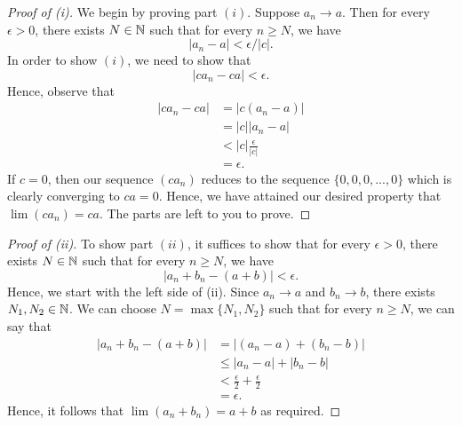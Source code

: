 \begin{proof}[Proof of (i)]
We begin by proving part \( (i)\). Suppose \( a_n \to a \). Then for every \( \epsilon  > 0 \), there exists 
\( N \in \mathbb{N} \) such that for every \( n \geq N \), we have 
\[ | a_n  - a  | < \epsilon / | c |. \tag{1}\]
In order to show \( (i)\), we need to show that 
\[ | ca_n - ca | < \epsilon.\]
Hence, observe that 
\begin{align*}
| ca_n - ca | &= | c(a_n - a) | \\
&= | c | | a_n - a  | \\  
&< | c | \frac{ \epsilon  }{ | c |} \\ 
&= \epsilon.   
\end{align*}
If \( c = 0 \), then our sequence \( (ca_n)\) reduces to the sequence \( \{0,0,0,...,0 \}\) which is clearly converging to \( ca = 0 \).
Hence, we have attained our desired property that \( \lim (ca_n) = ca\).
The parts are left to you to prove.
\end{proof}%
\begin{proof}[Proof of (ii)]
    To show part \( (ii)\), it suffices to show that for every \( \epsilon> 0 \), there exists \( N \in \mathbb{N} \) such that for every \( n \geq N \), we have 
    \[ | a_n + b_n - (a+b) | < \epsilon.\] Hence, we start with the left side of (ii). Since \( a_n \to a \) and \( b_n \to b\), there exists \( N_1, N_2 \in \mathbb{N} \). We can choose \( N = \max \{ N_1, N_2 \}\) such that for every \( n \geq N \), we can say that 
    \begin{align*}
     | a_n + b_n - (a + b) | &= | (a_n-a) + (b_n - b) |  \\
                             &\leq | a_n - a  |  + | b_n - b | \\ 
                             &< \frac{ \epsilon }{2} + \frac{ \epsilon }{ 2} \\  
                             &= \epsilon. 
    \end{align*}
Hence, it follows that \( \lim (a_n + b_n) = a + b \) as required.

\end{proof}%

